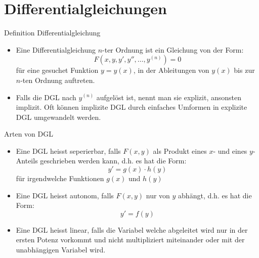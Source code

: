 \section{Differentialgleichungen}
\begin{definition}{Definition Differentialgleichung}\\
  \begin{itemize}
    \item Eine Differentialgleichung \(n\)-ter Ordnung ist ein Gleichung von der Form:
      \[F(x,y,y',y'',\ldots,y^{(n)})=0\]
      für eine gesuchet Funktion \(y=y(x)\), in der Ableitungen von \(y(x)\) bis zur \(n\)-ten Ordnung auftreten.
    \item Falls die DGL nach \(y^{(n)}\) aufgelöst ist, nennt man sie explizit, ansonsten implizit.
      Oft können implizite DGL durch einfaches Umformen in explizite DGL umgewandelt werden.
  \end{itemize}
\end{definition}
\begin{definition}{Arten von DGL}\\
  \begin{itemize}
    \item Eine DGL heisst seperierbar, falls \(F(x,y)\) als Produkt eines \(x\)- und eines \(y\)-Anteils geschrieben
      werden kann, d.h. es hat die Form:
      \[y'=g(x)\cdot h(y)\]
      für irgendwelche Funktionen \(g(x)\) und \(h(y)\)
    \item Eine DGL heisst autonom, falls \(F(x,y)\) nur von \(y\) abhängt, d.h. es hat die Form:
      \[y'=f(y)\]
    \item Eine DGL heisst linear, falls die Variabel welche abgeleitet wird nur in der ersten Potenz vorkommt und nicht
      multipliziert miteinander oder mit der unabhängigen Variabel wird.
  \end{itemize}
\end{definition}
